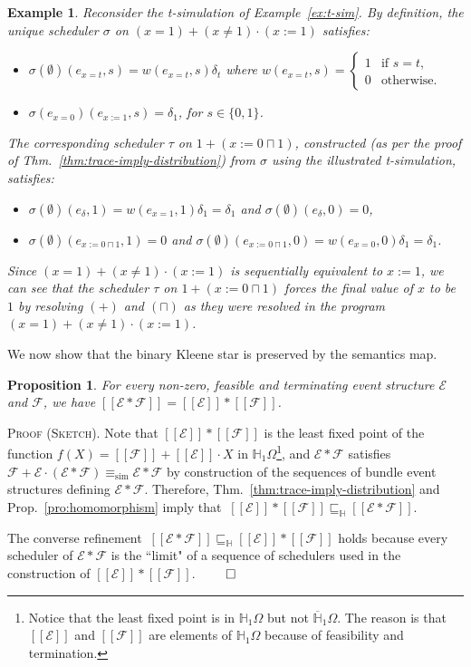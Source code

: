 \documentclass[review]{elsart}
\newtheorem{proposition}[definition]{Proposition}
\newtheorem{example}[definition]{Example}
\newenvironment{proofsummary}{\par
\noindent
\textsc{Proof (Sketch). }
\noindent}{\hfill\(\qed\)}
\renewcommand{\H}{\mathbb{H}}
\newcommand{\Hip}{\overline{\mathbb{H}}_1}
\newcommand{\EE}{\mathcal{E}}
\newcommand{\FF}{\mathcal{F}}
\newcommand{\sem}[1]{[\![#1]\!]}
\newcommand{\bks}{*}
\newcommand{\refbyh}{\sqsubseteq_{\mathbb{H}}}
\newcommand{\Prop}[1]{Prop.~\ref{#1}}
\newcommand{\Thm}[1]{Thm.~\ref{#1}}
\begin{document}
\begin{example}
Reconsider the t-simulation of Example~\ref{ex:t-sim}. By definition, the unique scheduler $\sigma$ on $(x{=}1) {+} (x{\neq}1){\cdot} (x{:=}1)$ satisfies:
\begin{itemize}
\item[-] $\sigma(\emptyset)(e_{x{=}t},s) = w(e_{x{=}t},s)\delta_t$ where
$w(e_{x{=}t},s) = \begin{cases}
1 & \textrm{if } s {=} t, \\
0 & \textrm{otherwise.}
\end{cases}$
\item[-] $\sigma(e_{x{=}0})(e_{x{:=}1},s) = \delta_1$, for $s{\in}\{0,1\}$.
\end{itemize}
The corresponding scheduler $\tau$ on $1{+}(x{:=}0{\sqcap}1)$, constructed (as per the proof of \Thm{thm:trace-imply-distribution}) from $\sigma$ using the illustrated t-simulation, satisfies:
\begin{itemize}
\item[-] $\sigma(\emptyset)(e_\delta,1) = w(e_{x{=}1},1)\delta_1 = \delta_1$ and $\sigma(\emptyset)(e_\delta,0) = 0$,
\item[-] $\sigma(\emptyset)(e_{x:=0{\sqcap}1},1)=0$ and $\sigma(\emptyset)(e_{x{:=}0{\sqcap}1},0) = w(e_{x{=}0},0)\delta_1 = \delta_1$.
\end{itemize}
Since $(x{=}1) {+} (x{\neq}1){\cdot} (x{:=}1)$ is sequentially equivalent to $x{:=}1$, we can see that the scheduler $\tau$ on $1{+}(x{:=}0{\sqcap}1)$ forces the final value of $x$ to be $1$ by resolving $(+)$ and $(\sqcap)$ as they were resolved in the program $(x{=}1) {+} (x{\neq}1){\cdot} (x{:=}1)$.
\end{example}

We now show that the binary Kleene star is preserved by the semantics map.

\begin{proposition}\label{pro:*-homomorphism}
For every non-zero, feasible and terminating event structure $\EE$ and $\FF$, we have $\sem{\EE{\bks}\FF} = \sem{\EE}{\bks}\sem{\FF}$.
\end{proposition}
\begin{proofsummary}
  Note that $\sem{\EE}{\bks}\sem{\FF}$ is the least fixed point of the function $f(X) = \sem{\FF}{+} \sem{\EE}{\cdot} X$ in $\H_1\Omega$\footnote{Notice that the least fixed point is in $\H_1\Omega$ but not $\Hip\Omega$. The reason is that $\sem{\EE}$ and $\sem{\FF}$ are elements of $\H_1\Omega$ because of feasibility and termination.}, and $\EE{\bks}\FF$ satisfies $\FF {+} \EE{\cdot}(\EE{\bks}\FF) \equiv_{\textrm{sim}} \EE{\bks}\FF$ by construction of the sequences of bundle event structures defining $\EE{\bks}\FF$. Therefore, \Thm{thm:trace-imply-distribution} and \Prop{pro:homomorphism} imply that $\ \sem{\EE}{\bks}\sem{\FF}\refbyh \sem{\EE{\bks}\FF}$.

The converse refinement $\ \sem{\EE{\bks}\FF}\refbyh\sem{\EE}{\bks}\sem{\FF}$ holds because every scheduler of $\EE{\bks}\FF$ is the ``limit" of a sequence of schedulers used in the construction of $\sem{\EE}{\bks}\sem{\FF}$.
\end{proofsummary}
\end{document}
